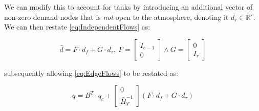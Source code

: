 We can modify this to account for tanks by introducing an additional vector of non-zero demand nodes that is \textit{not} open to the atmosphere, denoting it $d_{\tau} \in \mathbb{R}^{\tau}$. We can then restate \cref{eq:IndependentFlows} as:

\begin{equation}\label{eq:IndependentFlowsWithTank}
	\bar{d} = F\cdot d_f + G \cdot d_{\tau}, 
	\ F = \begin{bmatrix}
		I_{e-1} \\ 0
	\end{bmatrix} 
	\wedge 
	G = \begin{bmatrix}
	0 \\ I_{\tau}
	\end{bmatrix}
\end{equation}

subsequently allowing \cref{eq:EdgeFlows} to be restated as:

\begin{equation}\label{eq:EdgeFlowsWithTank}
	q = B^T\cdot q_c +
	\begin{bmatrix} 0 \\ \bar{H}_T^{-1} \end{bmatrix} (F \cdot d_f + G \cdot d_{\tau})
\end{equation}
